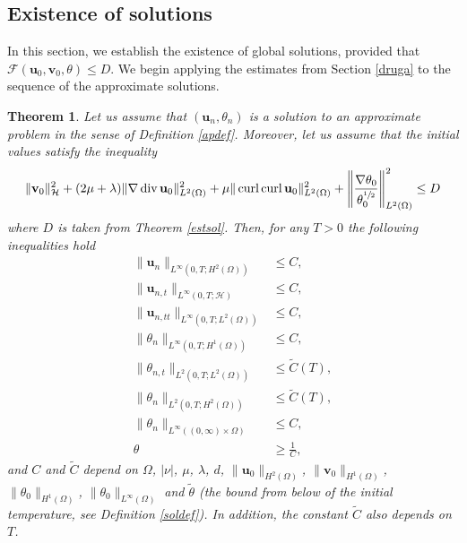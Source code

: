 \documentclass[11pt]{article}
\numberwithin{equation}{section}
\theoremstyle{plain}
\newtheorem{tw}[defi]{Theorem}
\newcommand\bb[1]{\mathbf{#1}}
\newcommand{\tn}{\Omega}
\newcommand{\htwo}{H^2(\Omega)}
\renewcommand{\hom}{H^1(\tn)}
\newcommand{\ld}{L^2(\Omega)}
\newcommand{\sul}{\sfrac{1}{2}}
\renewcommand{\div}{\operatorname{div}}
\DeclareMathOperator{\curl}{curl}
\newcommand{\F}{\mathcal{F}}
\newcommand{\initcond}{\|\bb{v}_0\|^2_{\H}+(2\mu+\lambda)\|\nabla\div\bb u_0\|^2_{\ld}+\mu\|\curl\curl\bb u_0\|_{\ld}^2+\left\|\frac{\nabla\theta_0}{{\theta^{\sul}_0}}\right\|^2_{\ld}\leq D}
\newcommand{\bu}{\bb{u}}
\renewcommand{\H}{\mathcal{H}}
\begin{document}
\subsection{Existence of solutions}\label{subex}
In this section, we establish the existence of global solutions, provided that $\F(\bu_0,\bb v_0,\theta)\leq D$. We begin applying the estimates from Section \ref{druga} to the sequence of the approximate solutions.
\begin{tw}\label{twglest}
Let us assume that $(\bu_n,\theta_n)$ is a solution to an approximate problem in the sense of Definition \ref{apdef}. Moreover, let us assume that the initial values satisfy the inequality
\begin{align*}
\initcond
\end{align*}
where $D$ is taken from Theorem \ref{estsol}. Then, for any $T>0$ the following inequalities hold
\begin{align}
\|\bb u_n\|_{L^{\infty}(0,T;\htwo)}&\leq C, \label{t1glest}\\
\|\bb u_{n,t}\|_{L^{\infty}(0,T;\H)}&\leq C,\label{t2glest}\\
\|\bb u_{n,tt}\|_{L^{\infty}(0,T;\ld)}&\leq C,\label{t3glest}\\
\|\theta_n\|_{L^{\infty}(0,T;\hom)}&\leq C,\label{t4glest}\\
\|\theta_{n,t}\|_{L^{2}(0,T;\ld)}&\leq \widetilde C(T),\label{t5glest}\\
\|\theta_n\|_{L^2(0,T;\htwo)}&\leq \widetilde C(T),\label{t6glest}\\
\|\theta_n\|_{L^{\infty}((0,\infty)\times\Omega)}&\leq C,\label{t7glest}\\
\theta&\geq \frac1C,\label{t8glest}
\end{align}
and $C$ and $\widetilde{C}$ depend on $\Omega$, $|\nu|$, $\mu$, $\lambda$, $d$, $\|\bb u_0\|_{\htwo}$, $\|\bb v_0\|_{\hom}$, $\|\theta_0\|_{\hom}$, $\|\theta_0\|_{L^{\infty}(\tn)}$ and $\tilde\theta$ (the bound from below of the initial temperature, see Definition \ref{soldef}). In addition, the constant $\widetilde C$ also depends on $T$.
\end{tw}
\end{document}
